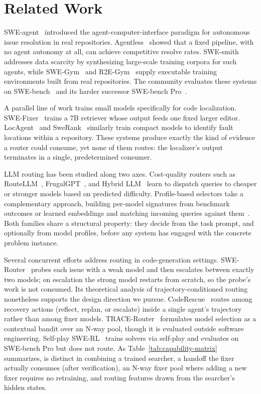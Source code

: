 
\section{Related Work}
\label{sec:related}

SWE-agent~\citep{sweagent} introduced the agent-computer-interface paradigm
for autonomous issue resolution in real repositories.
Agentless~\citep{agentless} showed that a fixed pipeline, with no agent
autonomy at all, can achieve competitive resolve rates.
SWE-smith~\citep{swesmith} addresses data scarcity by synthesizing
large-scale training corpora for such agents, while
SWE-Gym~\citep{swegym} and R2E-Gym~\citep{r2egym} supply executable
training environments built from real repositories.
The community evaluates these systems on
SWE-bench~\citep{swebench} and its harder successor
SWE-bench Pro~\citep{swebenchpro}.

A parallel line of work trains small models specifically for code
localization.
SWE-Fixer~\citep{swefixer} trains a 7B retriever whose output feeds one
fixed larger editor.
LocAgent~\citep{locagent} and SweRank~\citep{swerank} similarly train
compact models to identify fault locations within a repository.
These systems produce exactly the kind of evidence a router could consume,
yet none of them routes: the localizer's output terminates in a single,
predetermined consumer.

LLM routing has been studied along two axes.
Cost-quality routers such as RouteLLM~\citep{routellm},
FrugalGPT~\citep{frugalgpt}, and Hybrid LLM~\citep{hybridllm} learn to
dispatch queries to cheaper or stronger models based on predicted difficulty.
Profile-based selectors take a complementary approach, building per-model
signatures from benchmark outcomes or learned
embeddings and matching incoming queries against
them~\citep{shnitzer,embedllm,iclrouter}.
Both families share a structural property: they decide from the task prompt,
and optionally from model profiles, before any system has engaged with the
concrete problem instance.

Several concurrent efforts address routing in code-generation settings.
SWE-Router~\citep{swerouter} probes each issue with a weak model and then
escalates between exactly two models; on escalation the strong model restarts
from scratch, so the probe's work is not consumed.
Its theoretical analysis of trajectory-conditioned routing nonetheless
supports the design direction we pursue.
CodeRescue~\citep{coderescue} routes among recovery actions (reflect,
replan, or escalate) inside a single agent's trajectory rather than among
fixer models.
TRACE-Router~\citep{tracerouter} formulates model selection as a contextual
bandit over an N-way pool, though it is evaluated outside software
engineering.
Self-play SWE-RL~\citep{selfplayswerl} trains solvers via self-play and
evaluates on SWE-bench Pro but does not route.
As Table~\ref{tab:capability-matrix} summarizes, \sysname is distinct in
combining a trained searcher, a handoff the fixer actually consumes (after
verification), an N-way fixer pool where adding a new fixer requires no
retraining, and routing features drawn from the searcher's hidden states.

